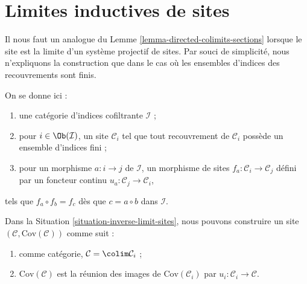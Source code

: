\section{Limites inductives de sites}
\label{section-colimit-sites}

\noindent
Il nous faut un analogue du Lemme \ref{lemma-directed-colimits-sections}
lorsque le site est la limite d’un système projectif de sites.
Par souci de simplicité, nous n’expliquons la construction que dans le cas où
les ensembles d’indices des recouvrements sont finis.

\begin{situation}
\label{situation-inverse-limit-sites}
On se donne ici :
\begin{enumerate}
\item une catégorie d’indices cofiltrante $\mathcal{I}$ ;
\item pour $i \in \Ob(\mathcal{I})$, un site $\mathcal{C}_i$ tel que tout
recouvrement de $\mathcal{C}_i$ possède un ensemble d’indices fini ;
\item pour un morphisme $a : i \to j$ de $\mathcal{I}$, un morphisme de sites
$f_a : \mathcal{C}_i \to \mathcal{C}_j$ défini par un foncteur continu
$u_a : \mathcal{C}_j \to \mathcal{C}_i$,
\end{enumerate}
tels que $f_a \circ f_b = f_c$ dès que $c = a \circ b$ dans $\mathcal{I}$.
\end{situation}

\begin{lemma}
\label{lemma-colimit-sites}
Dans la Situation \ref{situation-inverse-limit-sites}, nous pouvons construire
un site $(\mathcal{C}, \text{Cov}(\mathcal{C}))$ comme suit :
\begin{enumerate}
\item comme catégorie, $\mathcal{C} = \colim \mathcal{C}_i$ ;
\item $\text{Cov}(\mathcal{C})$ est la réunion des images
de $\text{Cov}(\mathcal{C}_i)$ par $u_i : \mathcal{C}_i \to \mathcal{C}$.
\end{enumerate}
\end{lemma}

